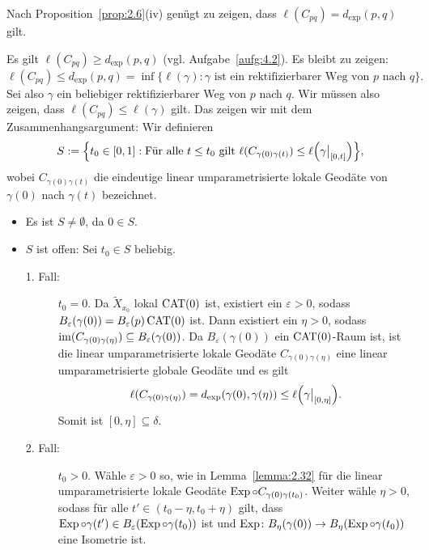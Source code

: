 \begin{beweis}
	Nach Proposition~\ref{prop:2.6}(iv) genügt zu zeigen, dass $\ell(C_{pq}) = d_{\exp}(p,q)$ gilt.
	
	Es gilt $\ell(C_{pq}) \geq d_{\exp}(p,q)$ (vgl. Aufgabe~\ref{aufg:4.2}). Es bleibt zu zeigen:
	\[
		\ell(C_{pq}) \leq d_{\exp}(p,q) = \inf\{ \ell(\gamma) : \gamma \text{ ist ein rektifizierbarer Weg von } p \text{ nach } q\}.
	\]
	Sei also $\gamma$ ein beliebiger rektifizierbarer Weg von $p$ nach $q$.
	Wir müssen also zeigen, dass $\ell(C_{pq}) \leq \ell(\gamma)$ gilt.
	Das zeigen wir mit dem Zusammenhangsargument:
	Wir definieren
	\[
		S := \penbrace*{ t_0 \in [0,1] : \text{Für alle } t \leq t_0 \text{ gilt } \ell(C_{\gamma(0)\gamma(t)}) \leq \ell\enbrace*{\gamma \big|_{[0,t]}}},
	\]
	wobei $C_{\gamma(0)\gamma(t)}$ die eindeutige linear umparametrisierte lokale Geodäte von $\gamma(0)$ nach $\gamma(t)$ bezeichnet.
	\begin{itemize}
		\item Es ist $S \neq \emptyset$, da $0 \in S$.
		\item $S$ ist offen:
		Sei $t_0 \in S$ beliebig.
		\begin{description}
			\item [1. Fall:] $t_0 = 0$.
			Da $\tilde{X}_{x_0}$ lokal $\operatorname{CAT(0)}$ ist, existiert ein $\varepsilon > 0$, sodass $B_\varepsilon(\gamma(0)) = B_\varepsilon(p) \operatorname{CAT(0)}$ ist.
			Dann existiert ein $\eta > 0$, sodass $\operatorname{im}(C_{\gamma(0)\gamma(\eta)}) \subseteq B_\varepsilon(\gamma(0))$.
			Da $B_\varepsilon(\gamma(0))$ ein $\operatorname{CAT(0)}$-Raum ist, ist die linear umparametrisierte lokale Geodäte $C_{\gamma(0)\gamma(\eta)}$ eine linear umparametrisierte globale Geodäte und es gilt
			\[
				\ell(C_{\gamma(0)\gamma(\eta)}) = d_{\exp}(\gamma(0),\gamma(\eta)) \leq \ell\enbrace*{\gamma \big|_{[0,\eta]}}.
			\]
			Somit ist $[0,\eta] \subseteq \delta$.
			\item[2. Fall:] $t_0 > 0$.
			Wähle $\varepsilon > 0$ so, wie in Lemma~\ref{lemma:2.32} für die linear umparametrisierte lokale Geodäte $\operatorname{Exp} \circ C_{\gamma(0)\gamma(t_0)}$.
			Weiter wähle $\eta > 0$, sodass für alle $t' \in (t_0-\eta, t_0 + \eta)$ gilt, dass $\operatorname{Exp} \circ \gamma(t') \in B_\varepsilon(\operatorname{Exp} \circ \gamma(t_0))$ ist und $\operatorname{Exp} \colon B_\eta(\gamma(0)) \rightarrow B_\eta(\operatorname{Exp}\circ \gamma(t_0))$ eine Isometrie ist.
			

\end{description}
\end{itemize}
\end{beweis}
